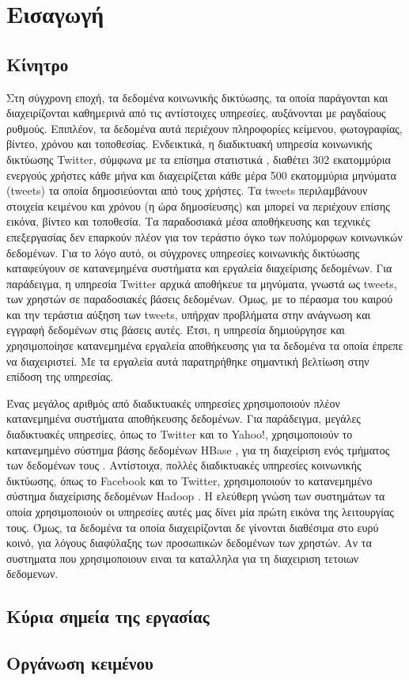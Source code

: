 \chapter{Εισαγωγή}

\section{Κίνητρο}

Στη σύγχρονη εποχή, τα δεδομένα κοινωνικής δικτύωσης, τα οποία παράγονται και \linebreak 
διαχειρίζονται καθημερινά από τις αντίστοιχες υπηρεσίες, αυξάνονται με ραγδαίους ρυθμούς. 
Επιπλέον, τα δεδομένα αυτά περιέχουν πληροφορίες κείμενου, φωτογραφίας, βίντεο, χρόνου και τοποθεσίας. Ενδεικτικά, η διαδικτυακή υπηρεσία κοινωνικής δικτύωσης Twitter, 
σύμφωνα με τα επίσημα στατιστικά \cite{1}, διαθέτει 302 εκατομμύρια ενεργούς χρήστες κάθε μήνα και διαχειρίζεται κάθε μέρα 500 εκατομμύρια μηνύματα (tweets) 
τα οποία δημοσιεύονται από τους χρήστες. Τα tweets περιλαμβάνουν στοιχεία κειμένου και χρόνου (η ώρα δημοσίευσης) και μπορεί να περιέχουν επίσης 
εικόνα, βίντεο και τοποθεσία. Τα παραδοσιακά μέσα αποθήκευσης και τεχνικές επεξεργασίας δεν επαρκούν πλέον για τον τεράστιο όγκο των πολύμορφων 
κοινωνικών δεδομένων. Για το λόγο αυτό, οι σύγχρονες υπηρεσίες κοινωνικής δικτύωσης 
καταφεύγουν σε κατανεμημένα συστήματα και εργαλεία διαχείρισης δεδομένων. Για παράδειγμα, η υπηρεσία Twitter \cite{2} αρχικά 
αποθήκευε τα μηνύματα, γνωστά ως tweets, των χρηστών σε παραδοσιακές βάσεις δεδομένων. Όμως, με το πέρασμα του καιρού και την τεράστια αύξηση των 
tweets, υπήρχαν προβλήματα στην ανάγνωση και εγγραφή δεδομένων στις βάσεις αυτές. Έτσι, η υπηρεσία δημιούργησε και χρησιμοποίησε κατανεμημένα εργαλεία αποθήκευσης 
για τα δεδομένα τα οποία έπρεπε να διαχειριστεί. Με τα εργαλεία αυτά παρατηρήθηκε σημαντική βελτίωση στην επίδοση της υπηρεσίας. 

Ένας μεγάλος αριθμός από διαδικτυακές υπηρεσίες χρησιμοποιούν πλέον κατανεμημένα \linebreak συστήματα αποθήκευσης δεδομένων. Για παράδειγμα, μεγάλες διαδικτυακές 
υπηρεσίες, όπως το Twitter και το Yahoo!, χρησιμοποιούν το κατανεμημένο σύστημα βάσης δεδομένων HBase \cite{3}, για τη διαχείριση 
ενός τμήματος των δεδομένων τους \cite{4}. Αντίστοιχα, πολλές διαδικτυακές υπηρεσίες κοινωνικής δικτύωσης, όπως το Facebook και το Twitter, 
χρησιμοποιούν το \linebreak κατανεμημένο σύστημα διαχείρισης δεδομένων Hadoop \cite{5} \cite{6}. Η ελεύθερη γνώση των συστημάτων τα οποία χρησιμοποιούν οι 
υπηρεσίες αυτές μας δίνει μία πρώτη εικόνα της λειτουργίας τους. Όμως, τα δεδομένα τα οποία διαχειρίζονται δε γίνονται διαθέσιμα στο ευρύ κοινό, για λόγους 
διαφύλαξης των προσωπικών δεδομένων των χρηστών. Aν τα συστηματα που χρησιμοποιουν ειναι τα καταλληλα για τη διαχειριση τετοιων δεδομενων.


\section{Κύρια σημεία της εργασίας}

\section{Οργάνωση κειμένου}
